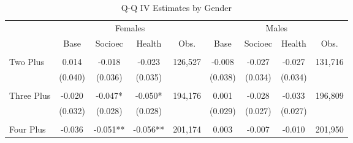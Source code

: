 \begin{table}[htpb!]\caption{Q-Q IV Estimates by Gender} 
\label{TWINtab:gend}\vspace{-5mm}\begin{center}\begin{tabular}{lcccccccc}
\toprule \toprule 
&\multicolumn{4}{c}{Females}&\multicolumn{4}{c}{Males}\\ 
\cmidrule(r){2-5} \cmidrule(r){6-9} 
&Base&Socioec&Health&Obs.&Base&Socioec&Health&Obs. \\ \midrule 
\begin{footnotesize}\end{footnotesize}&\begin{footnotesize}\end{footnotesize}&\begin{footnotesize}\end{footnotesize}&\begin{footnotesize}\end{footnotesize}&\begin{footnotesize}\end{footnotesize}&\begin{footnotesize}\end{footnotesize}&\\Two Plus &0.014&-0.018&-0.023&126,527&-0.008&-0.027&-0.027&131,716\\
&(0.040)&(0.036)&(0.035)&&(0.038)&(0.034)&(0.034)&\\
\begin{footnotesize}\end{footnotesize}&\begin{footnotesize}\end{footnotesize}&\begin{footnotesize}\end{footnotesize}&\begin{footnotesize}\end{footnotesize}&\begin{footnotesize}\end{footnotesize}&\begin{footnotesize}\end{footnotesize}&\\Three Plus &-0.020&-0.047*&-0.050*&194,176&0.001&-0.028&-0.033&196,809\\
&(0.032)&(0.028)&(0.028)&&(0.029)&(0.027)&(0.027)&\\
\begin{footnotesize}\end{footnotesize}&\begin{footnotesize}\end{footnotesize}&\begin{footnotesize}\end{footnotesize}&\begin{footnotesize}\end{footnotesize}&\begin{footnotesize}\end{footnotesize}&\begin{footnotesize}\end{footnotesize}&\\Four Plus &-0.036&-0.051**&-0.056**&201,174&0.003&-0.007&-0.010&201,950\\

\end{tabular}
\end{center}
\end{table}
